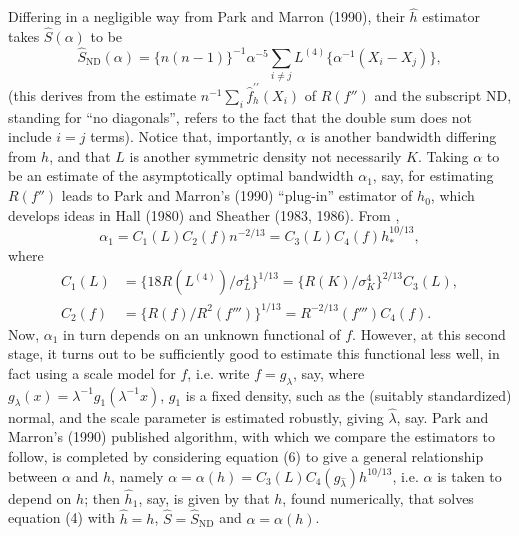 \documentclass[11pt]{article}
\newcommand{\fhat}{\widehat f}
\newcommand{\SND}{\widehat S_{\mathrm{ND}}}
\begin{document}
Differing in a negligible way from Park and Marron (1990), their $\widehat h$ estimator takes $\widehat S(\alpha)$ to be
\begin{equation}
\SND(\alpha)=\{n(n-1)\}^{-1}\alpha^{-5}\sum_{i\ne j}L^{(4)}\{\alpha^{-1}(X_i-X_j)\},
\tag{5}
\end{equation}
(this derives from the estimate $n^{-1}\sum_i\fhat_h^{\prime\prime}(X_i)$ of $R(f'')$ and the subscript ND, standing for ``no diagonals'', refers to the fact that the double sum does not include $i=j$ terms). Notice that, importantly, $\alpha$ is another bandwidth differing from $h$, and that $L$ is another symmetric density not necessarily $K$. Taking $\alpha$ to be an estimate of the asymptotically optimal bandwidth $\alpha_1$, say, for estimating $R(f'')$ leads to Park and Marron's (1990) ``plug-in'' estimator of $h_0$, which develops ideas in Hall (1980) and Sheather (1983, 1986). From \citet{hallmarron1987},
\begin{equation}
\alpha_1=C_1(L)C_2(f)n^{-2/13}=C_3(L)C_4(f)h_*^{10/13},
\tag{6}
\end{equation}
where
\begin{align*}
C_1(L)&=\{18R(L^{(4)})/\sigma_L^4\}^{1/13}
=\{R(K)/\sigma_K^4\}^{2/13}C_3(L),\\
C_2(f)&=\{R(f)/R^2(f''')\}^{1/13}=R^{-2/13}(f''')C_4(f).
\end{align*}
Now, $\alpha_1$ in turn depends on an unknown functional of $f$. However, at this second stage, it turns out to be sufficiently good to estimate this functional less well, in fact using a scale model for $f$, i.e. write $f=g_\lambda$, say, where $g_\lambda(x)=\lambda^{-1}g_1(\lambda^{-1}x)$, $g_1$ is a fixed density, such as the (suitably standardized) normal, and the scale parameter is estimated robustly, giving $\widehat\lambda$, say. Park and Marron's (1990) published algorithm, with which we compare the estimators to follow, is completed by considering equation (6) to give a general relationship between $\alpha$ and $h$, namely $\alpha=\alpha(h)=C_3(L)C_4(g_{\widehat\lambda})h^{10/13}$, i.e. $\alpha$ is taken to depend on $h$; then $\widehat h_1$, say, is given by that $h$, found numerically, that solves equation (4) with $\widehat h=h$, $\widehat S=\SND$ and $\alpha=\alpha(h)$.
\end{document}
